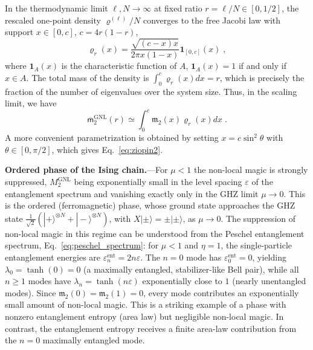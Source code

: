 \documentclass[aps,prl,twocolumn,superscriptaddress,reprint,longbibliography,nofootinbib]{revtex4-2}
\begin{document}
In the thermodynamic limit $\ell,N\to\infty$ at fixed ratio $r=\ell/N\in[0,1/2]$, the rescaled  one-point density $\varrho^{(\ell)}/N$ converges to the free Jacobi law with support $x\in [0,c]$, $c=4r(1-r)$,
\begin{equation}
    \varrho_r(x) = \frac{\sqrt{(c-x)x}}{2\pi x(1-x)}\mathbf{1}_{[0,c]}(x)\;,
\end{equation}
where $\mathbf{1}_A(x)$ is the characteristic function of $A$, $\mathbf{1}_A(x)=1$ if and only if $x\in A$.
The total mass of the density is $\int_0^c \varrho_r(x) dx=r$, which is precisely the fraction of the number of eigenvalues over the system size.
Thus, in the scaling limit, we have
\begin{equation}
\overline{\mathsf{m}}_2^\mathrm{GNL}(r)\simeq \int_0^c \mathfrak{m}_2(x) \varrho_r(x)dx\;.
\end{equation}
A more convenient parametrization is obtained by setting $x=c\sin^2\theta$  with $\theta\in[0,\pi/2]$, which gives Eq.~\eqref{eq:ziopin2}.

\textbf{Ordered phase of the Ising chain.}---For $\mu<1$ the non-local magic is strongly suppressed, $M_2^{\mathrm{GNL}}$ being exponentially small in the level spacing $\varepsilon$ of the entanglement spectrum and vanishing exactly only in the GHZ limit $\mu\to0$. This is the ordered (ferromagnetic) phase, whose ground state approaches the GHZ state $\frac{1}{\sqrt{2}}(|{+}\rangle^{\otimes N}+|{-}\rangle^{\otimes N})$, with $X|{\pm}\rangle=\pm|{\pm}\rangle$, as $\mu\to 0$. The suppression of non-local magic in this regime can be understood from the Peschel entanglement spectrum, Eq.~\eqref{eq:peschel_spectrum}: for $\mu<1$ and $\eta=1$, the single-particle entanglement energies are $\varepsilon_n^{\mathrm{ent}}=2n\varepsilon$. The $n=0$ mode has $\varepsilon_0^{\mathrm{ent}}=0$, yielding $\lambda_0=\tanh(0)=0$ (a maximally entangled, stabilizer-like Bell pair), while all $n\ge 1$ modes have $\lambda_n=\tanh(n\varepsilon)$ exponentially close to $1$ (nearly unentangled modes). Since $\mathfrak{m}_2(0)=\mathfrak{m}_2(1)=0$, every mode contributes an exponentially small amount of non-local magic. This is a striking example of a phase with nonzero entanglement entropy (area law) but negligible  non-local magic. In contrast, the entanglement entropy receives a finite area-law contribution from the $n=0$ maximally entangled mode.
\end{document}

